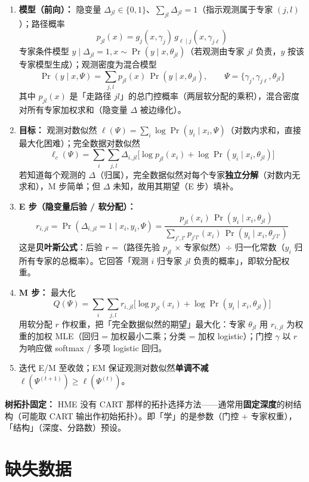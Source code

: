 \begin{enumerate}
    \item \textbf{模型（前向）：} 隐变量 $\Delta_{jl} \in \{0,1\}$、$\sum_{jl}\Delta_{jl} = 1$（指示观测属于专家 $(j,l)$）；路径概率
    \[
        p_{jl}(x) = g_j(x,\gamma_j)\,g_{\ell \mid j}(x,\gamma_{j\ell})
    \]
    专家条件模型 $y \mid \Delta_{jl}=1, x \sim \Pr(y \mid x, \theta_{jl})$（若观测由专家 $jl$ 负责，$y$ 按该专家模型生成）；观测密度为混合模型
    \[
        \Pr(y \mid x, \Psi) = \sum_{j,l} p_{jl}(x)\,\Pr(y \mid x, \theta_{jl}),\qquad \Psi = \{\gamma_j, \gamma_{j\ell}, \theta_{jl}\}
    \]
    其中 $p_{jl}(x)$ 是「走路径 $jl$」的总门控概率（两层软分配的乘积），混合密度对所有专家加权求和（隐变量 $\Delta$ 被边缘化）。
    \item \textbf{目标：} 观测对数似然 $\ell(\Psi) = \sum_i \log\Pr(y_i \mid x_i, \Psi)$（对数内求和，直接最大化困难）；完全数据对数似然
    \[
        \ell_c(\Psi) = \sum_i \sum_{j,l}\Delta_{i,jl}\bigl[\log p_{jl}(x_i) + \log\Pr(y_i \mid x_i, \theta_{jl})\bigr]
    \]
    若知道每个观测的 $\Delta$（归属），完全数据似然对每个专家\textbf{独立分解}（对数内无求和），M 步简单；但 $\Delta$ 未知，故用其期望（E 步）填补。
    \item \textbf{E 步（隐变量后验 / 软分配）：}
    \[
        r_{i,jl} = \Pr(\Delta_{i,jl}=1 \mid x_i, y_i, \Psi) = \frac{p_{jl}(x_i)\,\Pr(y_i \mid x_i, \theta_{jl})}{\sum_{j',l'} p_{j'l'}(x_i)\,\Pr(y_i \mid x_i, \theta_{j'l'})}
    \]
    这是\textbf{贝叶斯公式}：后验 $r$ =（路径先验 $p_{jl}$ × 专家似然）$\div$ 归一化常数（$y_i$ 归所有专家的总概率）。它回答「观测 $i$ 归专家 $jl$ 负责的概率」，即软分配权重。
    \item \textbf{M 步：} 最大化
    \[
        Q(\Psi) = \sum_i\sum_{j,l} r_{i,jl}\bigl[\log p_{jl}(x_i) + \log\Pr(y_i \mid x_i, \theta_{jl})\bigr]
    \]
    用软分配 $r$ 作权重，把「完全数据似然的期望」最大化：专家 $\theta_{jl}$ 用 $r_{i,jl}$ 为权重的加权 MLE（回归 = 加权最小二乘；分类 = 加权 logistic）；门控 $\gamma$ 以 $r$ 为响应做 softmax / 多项 logistic 回归。
    \item 迭代 E/M 至收敛；EM 保证观测对数似然\textbf{单调不减} $\ell(\Psi^{(t+1)}) \ge \ell(\Psi^{(t)})$。
\end{enumerate}

\textbf{树拓扑固定：} HME 没有 CART 那样的拓扑选择方法——通常用\textbf{固定深度}的树结构（可能取 CART 输出作初始拓扑）。即「学」的是参数（门控 + 专家权重），「结构」（深度、分路数）预设。

\section{缺失数据}

